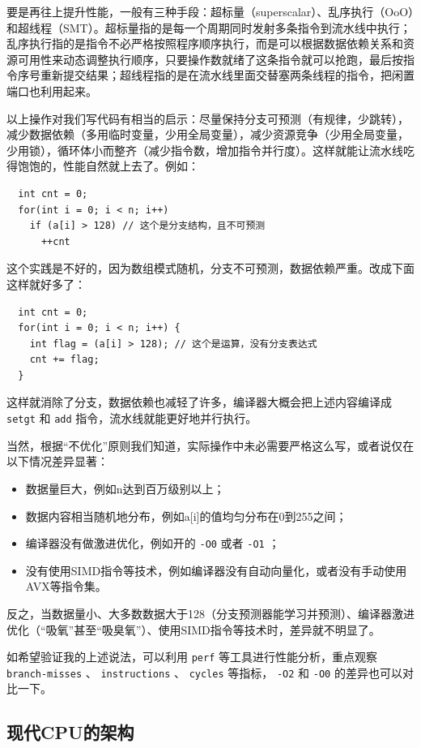 要是再往上提升性能，一般有三种手段：超标量（superscalar）、乱序执行（OoO）和超线程（SMT）。超标量指的是每一个周期同时发射多条指令到流水线中执行；乱序执行指的是指令不必严格按照程序顺序执行，而是可以根据数据依赖关系和资源可用性来动态调整执行顺序，只要操作数就绪了这条指令就可以抢跑，最后按指令序号重新提交结果；超线程指的是在流水线里面交替塞两条线程的指令，把闲置端口也利用起来。

以上操作对我们写代码有相当的启示：尽量保持分支可预测（有规律，少跳转），减少数据依赖（多用临时变量，少用全局变量），减少资源竞争（少用全局变量，少用锁），循环体小而整齐（减少指令数，增加指令并行度）。这样就能让流水线吃得饱饱的，性能自然就上去了。例如：
\begin{verbatim}
  int cnt = 0;
  for(int i = 0; i < n; i++)
    if (a[i] > 128) // 这个是分支结构，且不可预测
      ++cnt
\end{verbatim}
这个实践是不好的，因为数组模式随机，分支不可预测，数据依赖严重。改成下面这样就好多了：
\begin{verbatim}
  int cnt = 0;
  for(int i = 0; i < n; i++) {
    int flag = (a[i] > 128); // 这个是运算，没有分支表达式
    cnt += flag;
  }
\end{verbatim}
这样就消除了分支，数据依赖也减轻了许多，编译器大概会把上述内容编译成 \texttt{setgt} 和 \texttt{add} 指令，流水线就能更好地并行执行。

\begin{tip}
  当然，根据“不优化”原则我们知道，实际操作中未必需要严格这么写，或者说仅在以下情况差异显著：
\begin{itemize}
  \item 数据量巨大，例如n达到百万级别以上；
  \item 数据内容相当随机地分布，例如a[i]的值均匀分布在0到255之间；
  \item 编译器没有做激进优化，例如开的 \texttt{-O0} 或者 \texttt{-O1} ；
  \item 没有使用SIMD指令等技术，例如编译器没有自动向量化，或者没有手动使用AVX等指令集。
\end{itemize}
反之，当数据量小、大多数数据大于128（分支预测器能学习并预测）、编译器激进优化（“吸氧”甚至“吸臭氧”）、使用SIMD指令等技术时，差异就不明显了。

如希望验证我的上述说法，可以利用 \texttt{perf} 等工具进行性能分析，重点观察 \texttt{branch-misses} 、 \texttt{instructions} 、 \texttt{cycles} 等指标， \texttt{-O2} 和 \texttt{-O0} 的差异也可以对比一下。
\end{tip}

\subsection{现代CPU的架构}

